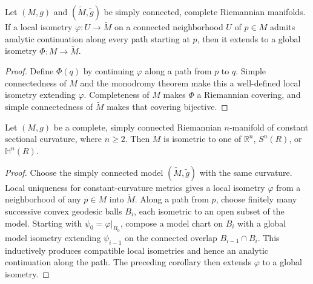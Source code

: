 \begin{corollary}
\label{cor:global-isometry-from-local-simply-connected}

Let $(M,g)$ and $(\widetilde M,\widetilde g)$ be simply connected, complete
Riemannian manifolds.  If a local isometry $\varphi:U\to\widetilde M$ on a
connected neighborhood $U$ of $p\in M$ admits analytic continuation along
every path starting at $p$, then it extends to a global isometry
$\Phi:M\to\widetilde M$.
\begin{proof}
\sketch Define $\Phi(q)$ by continuing $\varphi$ along a path from $p$ to
$q$.  Simple connectedness of $M$ and the monodromy theorem make this a
well-defined local isometry extending $\varphi$.  Completeness of $M$ makes
$\Phi$ a Riemannian covering, and simple connectedness of $\widetilde M$ makes
that covering bijective.
\end{proof}
\end{corollary}

\begin{theorem}
\label{thm:killing-hopf}

Let $(M,g)$ be a complete, simply connected Riemannian $n$-manifold of
constant sectional curvature, where $n\geq2$.  Then $M$ is isometric to one
of $\mathbb R^n$, $S^n(R)$, or $\mathbb H^n(R)$.
\begin{proof}
\sketch Choose the simply connected model $(\widetilde M,\widetilde g)$ with
the same curvature.  Local uniqueness for constant-curvature metrics gives a
local isometry $\varphi$ from a neighborhood of any $p\in M$ into
$\widetilde M$.  Along a path from $p$, choose finitely many successive convex
geodesic balls $B_i$, each isometric to an open subset of the model.  Starting
with $\psi_0=\varphi|_{B_0}$, compose a model chart on $B_i$ with a global
model isometry extending $\psi_{i-1}$ on the connected overlap
$B_{i-1}\cap B_i$.  This inductively produces compatible local isometries and
hence an analytic continuation along the path.  The preceding corollary then
extends $\varphi$ to a global isometry.
\end{proof}
\end{theorem}

